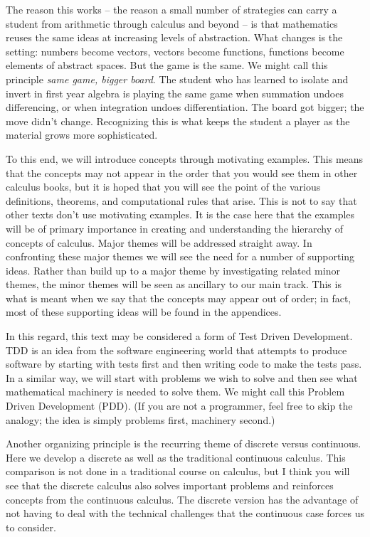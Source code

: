 The reason this works -- the reason a small number of strategies can 
carry a student from arithmetic through calculus and beyond -- is that 
mathematics reuses the same ideas at increasing levels of abstraction. 
What changes is the setting: numbers become vectors, vectors 
become functions, functions become elements of abstract spaces. 
But the game is the same. We might call this principle 
{\it same game, bigger board\/}. The student who has learned to isolate 
and invert in first year algebra is playing the same game when 
summation undoes differencing, or when integration undoes 
differentiation. The board got bigger; the move didn't change. 
Recognizing this is what keeps the student a player as the 
material grows more sophisticated.

To this end, we will introduce 
concepts through motivating examples.  This means that
the concepts may not appear in the order that you would see them in other
calculus books, but it is hoped that you will see the point of the various
definitions, theorems, and computational rules that arise. This is not to say 
that other texts don't use motivating examples. It is the case here that 
the examples will be of primary importance in creating and understanding  
the hierarchy of concepts of calculus. Major themes will be addressed straight 
away. In confronting these major themes we will see the need for a number 
of supporting ideas. Rather than build up to a major theme by 
investigating related minor themes, the minor themes will be seen as ancillary 
to our main track. This is what is meant when we say that the concepts 
may appear out of order; in fact, most of these supporting ideas will be found in the appendices.

In this regard, this text may be considered a form of 
Test Driven Development. TDD is an idea from the software engineering world 
that attempts to produce software by starting with tests first and then
writing code to make the tests pass. In a similar way, we will 
start with 
problems we wish to solve and then see what mathematical machinery is needed
to solve them. We might call this Problem Driven Development (PDD).
(If you are not a programmer, feel free to skip the analogy; the idea is
simply problems first, machinery second.)

Another organizing principle is the recurring theme of discrete versus continuous.
Here we develop a discrete as well as the traditional continuous calculus. 
This comparison is not 
done in a traditional course on calculus, but I think you will see that the 
discrete calculus also solves important problems and reinforces
concepts from the continuous calculus.
The discrete version has the
advantage of not having to deal with the technical challenges that the
continuous case forces us to consider.

